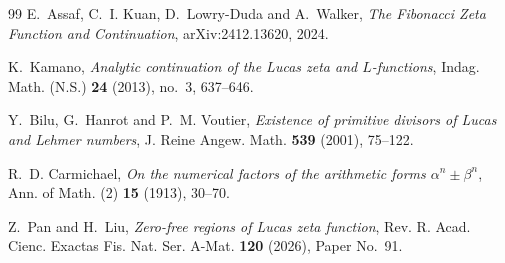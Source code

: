 \documentclass[11pt]{article}
\theoremstyle{remark}
\begin{document}
\begin{thebibliography}{99}
E.~Assaf, C.~I. Kuan, D.~Lowry-Duda and A.~Walker,
\emph{The Fibonacci Zeta Function and Continuation},
arXiv:2412.13620, 2024.

K.~Kamano,
\emph{Analytic continuation of the Lucas zeta and $L$-functions},
Indag. Math. (N.S.) \textbf{24} (2013), no.~3, 637--646.

Y.~Bilu, G.~Hanrot and P.~M. Voutier,
\emph{Existence of primitive divisors of Lucas and Lehmer numbers},
J. Reine Angew. Math. \textbf{539} (2001), 75--122.

R.~D. Carmichael,
\emph{On the numerical factors of the arithmetic forms $\alpha^n\pm\beta^n$},
Ann. of Math. (2) \textbf{15} (1913), 30--70.

Z.~Pan and H.~Liu,
\emph{Zero-free regions of Lucas zeta function},
Rev. R. Acad. Cienc. Exactas Fis. Nat. Ser. A-Mat. \textbf{120} (2026), Paper No.~91.

\end{thebibliography}
\end{document}
